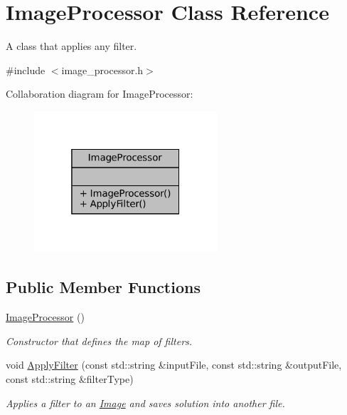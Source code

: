 \hypertarget{classImageProcessor}{}\section{Image\+Processor Class Reference}
\label{classImageProcessor}


A class that applies any filter.  




{\ttfamily \#include $<$image\+\_\+processor.\+h$>$}



Collaboration diagram for Image\+Processor\+:\nopagebreak
\begin{figure}[H]
\begin{center}
\leavevmode
\includegraphics[width=193pt]{classImageProcessor__coll__graph}
\end{center}
\end{figure}
\subsection*{Public Member Functions}
\begin{DoxyCompactItemize}
\item 
\mbox{\label{classImageProcessor_aa9201a4d14b20ac968919145db3a588b}} 
\hyperlink{classImageProcessor_aa9201a4d14b20ac968919145db3a588b}{Image\+Processor} ()
\begin{DoxyCompactList}\small\item\em Constructor that defines the map of filters. \end{DoxyCompactList}\item 
void \hyperlink{classImageProcessor_ad7ed2647ee8a70d015216d8883e25804}{Apply\+Filter} (const std\+::string \&input\+File, const std\+::string \&output\+File, const std\+::string \&filter\+Type)
\begin{DoxyCompactList}\small\item\em Applies a filter to an \hyperlink{classImage}{Image} and saves solution into another file. \end{DoxyCompactList}\end{DoxyCompactItemize}


